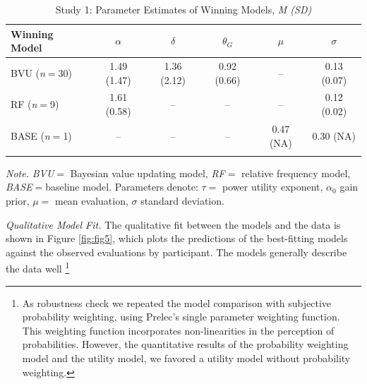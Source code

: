\documentclass[a4paper, man, floatsintext]{apa6}
\let\rmarkdownfootnote\footnote%
\def\footnote{\protect\rmarkdownfootnote}
\begin{document}
\begin{table}[tbp]

\begin{center}
\begin{threeparttable}

\caption{\label{tab:study1_parameter}Study 1: Parameter Estimates of Winning Models, \textit{M (SD)}}

\begin{tabular}{lccccc}
\toprule
Winning Model & $\alpha$ & $\delta$ & $\theta_G$ & $\mu$ & $\sigma$\\
\midrule
BVU (\textit{n}$=$30) & 1.49 (1.47) & 1.36 (2.12) & 0.92 (0.66) & -- & 0.13 (0.07)\\
RF (\textit{n}$=$9) & 1.61 (0.58) & -- & -- & -- & 0.12 (0.02)\\
BASE (\textit{n}$=$1) & -- & -- & -- & 0.47 (NA) & 0.30 (NA)\\
\bottomrule
\addlinespace
\end{tabular}

\begin{tablenotes}[para]
\normalsize{\textit{Note.} \textit{BVU}$=$ Bayesian value updating model, \textit{RF}$=$ relative frequency model, \textit{BASE}$=$baseline model. Parameters denote: $\tau =$ power utility exponent, $\alpha_0$ gain prior, $\mu=$ mean evaluation, $\sigma$ standard deviation.}
\end{tablenotes}

\end{threeparttable}
\end{center}

\end{table}

\textit{Qualitative Model Fit.} The qualitative fit between the models
and the data is shown in Figure \ref{fig:fig5}, which plots the
predictions of the best-fitting models against the observed evaluations
by participant. The models generally describe the data well
\footnote{As robustness check we repeated the model comparison with subjective probability weighting, using Prelec’s \citeyear{Prelec1998} single parameter weighting function. This weighting function incorporates non-linearities in the perception of probabilities. However, the quantitative results of the probability weighting model and the utility model, we favored a utility model without probability weighting.}
\end{document}
